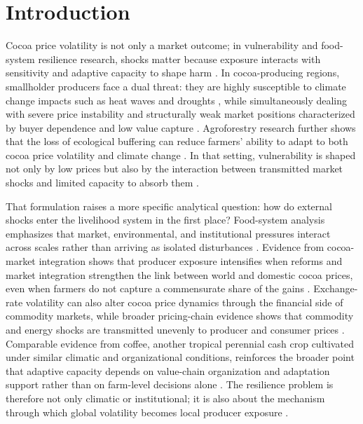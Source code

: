 \documentclass[11pt]{article}
\begin{document}
\section{Introduction}

Cocoa price volatility is not only a market outcome; in vulnerability and food-system resilience research, shocks matter because exposure interacts with sensitivity and adaptive capacity to shape harm \citep{Tendall2015,Zurek2022}. In cocoa-producing regions, smallholder producers face a dual threat: they are highly susceptible to climate change impacts such as heat waves and droughts \citep{Jacobi2013, Lahive2019, Vaast2014}, while simultaneously dealing with severe price instability and structurally weak market positions characterized by buyer dependence and low value capture \citep{Mithofer2017, Tsowou2019}. Agroforestry research further shows that the loss of ecological buffering can reduce farmers' ability to adapt to both cocoa price volatility and climate change \citep{Vaast2014}. In that setting, vulnerability is shaped not only by low prices but also by the interaction between transmitted market shocks and limited capacity to absorb them \citep{parker2019,gatto2021,TsowouGayi2019}.

That formulation raises a more specific analytical question: how do external shocks enter the livelihood system in the first place? Food-system analysis emphasizes that market, environmental, and institutional pressures interact across scales rather than arriving as isolated disturbances \citep{Ericksen2008,Orchard2019}. Evidence from cocoa-market integration shows that producer exposure intensifies when reforms and market integration strengthen the link between world and domestic cocoa prices, even when farmers do not capture a commensurate share of the gains \citep{TsowouGayi2019}. Exchange-rate volatility can also alter cocoa price dynamics through the financial side of commodity markets, while broader pricing-chain evidence shows that commodity and energy shocks are transmitted unevenly to producer and consumer prices \citep{Poku2017,JimenezRodriguez2022}. Comparable evidence from coffee, another tropical perennial cash crop cultivated under similar climatic and organizational conditions, reinforces the broader point that adaptive capacity depends on value-chain organization and adaptation support rather than on farm-level decisions alone \citep{Gereffi2005,Morales2022}. The resilience problem is therefore not only climatic or institutional; it is also about the mechanism through which global volatility becomes local producer exposure \citep{Merkle2021}.
\end{document}
